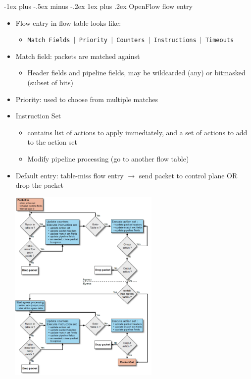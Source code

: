 \documentclass[10pt,landscape]{article}
\makeatletter
\newcommand{\subsubsubsection}{\@startsection{subsubsection}{3}{0mm}%
                                {-1ex plus -.5ex minus -.2ex}%
                                {1ex plus .2ex}%
                                {\normalfont\scriptsize\bfseries}}
\makeatother
\begin{document}
\begin{multicols*}{3}
\subsubsubsection{OpenFlow flow entry}
\begin{itemize}[topsep=0pt,noitemsep,wide=0pt, leftmargin=\dimexpr{} + 2\relax]
  \item Flow entry in flow table looks like:
  \begin{itemize}[topsep=0pt,noitemsep,wide=0pt, leftmargin=\dimexpr{} + 2\relax]
    \item \texttt{Match Fields $|$ Priority $|$ Counters $|$ Instructions $|$ Timeouts}
  \end{itemize}
  \item Match field: packets are matched against
  \begin{itemize}[topsep=0pt,noitemsep,wide=0pt, leftmargin=\dimexpr{} + 2\relax]
    \item Header fields and pipeline fields, may be wildcarded (any) or bitmasked (subset of bits)
  \end{itemize}
  \item Priority: used to choose from multiple matches
  \item Instruction Set
  \begin{itemize}[topsep=0pt,noitemsep,wide=0pt, leftmargin=\dimexpr{} + 2\relax]
    \item contains list of actions to apply immediately, and a set of actions to add to the action set
    \item Modify pipeline processing (go to another flow table)
  \end{itemize}
  \item Default entry: table-miss flow entry $\rightarrow$ send packet to control plane OR drop the packet
\end{itemize}

\includegraphics*[width=8.5cm, height=9.5cm]{images/ingressegress.PNG}



\end{multicols*}
\end{document}
